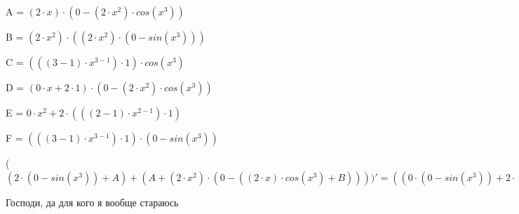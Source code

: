 \documentclass[12pt,a4paper,fleqn]{article}
\begin{document}
\begin{center}
A = $(2 \cdot x) \cdot (0-(2 \cdot x^{2}) \cdot cos(x^{3}))$\end{center}
\begin{center}
B = $(2 \cdot x^{2}) \cdot ((2 \cdot x^{2}) \cdot (0-sin(x^{3})))$\end{center}
\begin{center}
C = $(((3-1) \cdot x^{3-1}) \cdot 1) \cdot cos(x^{3})$\end{center}
\begin{center}
D = $(0 \cdot x+2 \cdot 1) \cdot (0-(2 \cdot x^{2}) \cdot cos(x^{3}))$\end{center}
\begin{center}
E = $0 \cdot x^{2}+2 \cdot (((2-1) \cdot x^{2-1}) \cdot 1)$\end{center}
\begin{center}
F = $(((3-1) \cdot x^{3-1}) \cdot 1) \cdot (0-sin(x^{3}))$\end{center}
\begin{center}
 ($(2 \cdot (0-sin(x^{3}))+A)+(A+(2 \cdot x^{2}) \cdot (0-((2 \cdot x) \cdot cos(x^{3})+B))))'
  = ((0 \cdot (0-sin(x^{3}))+2 \cdot (0-C))+(D+(2 \cdot x) \cdot (0-((E) \cdot cos(x^{3})+(2 \cdot x^{2}) \cdot (F)))))+((D+(2 \cdot x) \cdot (0-((E) \cdot cos(x^{3})+(2 \cdot x^{2}) \cdot (F))))+((E) \cdot (0-((2 \cdot x) \cdot cos(x^{3})+B))+(2 \cdot x^{2}) \cdot (0-(((0 \cdot x+2 \cdot 1) \cdot cos(x^{3})+(2 \cdot x) \cdot (F))+((E) \cdot ((2 \cdot x^{2}) \cdot (0-sin(x^{3})))+(2 \cdot x^{2}) \cdot ((E) \cdot (0-sin(x^{3}))+(2 \cdot x^{2}) \cdot (0-C)))))))$\end{center}
Господи, да для кого я вообще стараюсь
\end{document}
